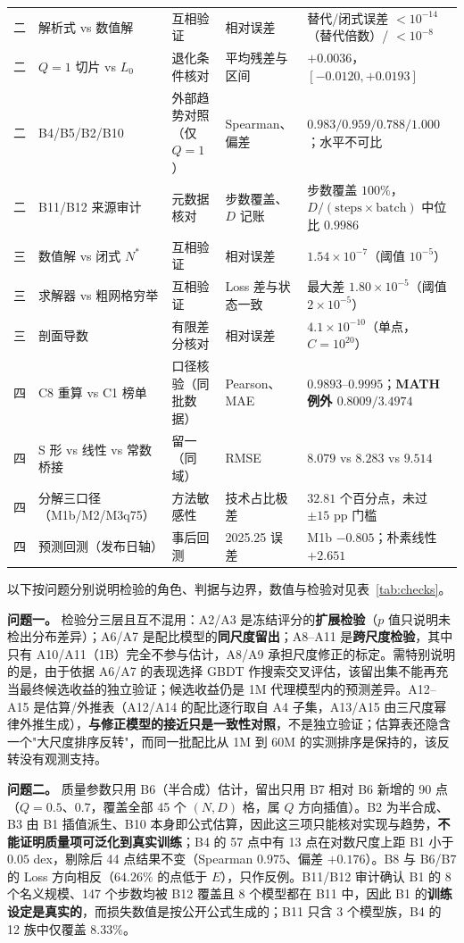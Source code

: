\begin{table}[H]
\begin{tabularx}{\textwidth}{@{}c p{3.85cm}p{1.55cm}p{2.25cm}X@{}}
二 & 解析式 vs 数值解 & 互相验证 & 相对误差 & 替代/闭式误差 $<10^{-14}$（替代倍数）/ $<10^{-8}$ \\
二 & $Q=1$ 切片 vs $L_0$ & 退化条件核对 & 平均残差与区间 & $+0.0036$，$[-0.0120,+0.0193]$ \\
二 & B4/B5/B2/B10 & 外部趋势对照（仅 $Q=1$） & Spearman、偏差 & $0.983/0.959/0.788/1.000$；水平不可比 \\
二 & B11/B12 来源审计 & 元数据核对 & 步数覆盖、$D$ 记账 & 步数覆盖 $100\%$，$D/(\text{steps}\times\text{batch})$ 中位比 $0.9986$ \\
三 & 数值解 vs 闭式 $N^*$ & 互相验证 & 相对误差 & $1.54\times10^{-7}$（阈值 $10^{-5}$）\\
三 & 求解器 vs 粗网格穷举 & 互相验证 & Loss 差与状态一致 & 最大差 $1.80\times10^{-5}$（阈值 $2\times10^{-5}$）\\
三 & 剖面导数 & 有限差分核对 & 相对误差 & $4.1\times10^{-10}$（单点，$C=10^{20}$） \\
四 & C8 重算 vs C1 榜单 & 口径核验（同批数据） & Pearson、MAE & $0.9893$–$0.9995$；\textbf{MATH 例外 $0.8009/3.4974$} \\
四 & S 形 vs 线性 vs 常数桥接 & 留一（同域） & RMSE & $8.079$ vs $8.283$ vs $9.514$ \\
四 & 分解三口径（M1b/M2/M3q75） & 方法敏感性 & 技术占比极差 & $32.81$ 个百分点，未过 $\pm15$ pp 门槛 \\
四 & 预测回测（发布日轴） & 事后回测 & 2025.25 误差 & M1b $-0.805$；朴素线性 $+2.651$ \\
\bottomrule
\end{tabularx}
\end{table}

以下按问题分别说明检验的角色、判据与边界，数值与检验对见表~\ref{tab:checks}。

\textbf{问题一。} 检验分三层且互不混用：A2/A3 是冻结评分的\textbf{扩展检验}（$p$ 值只说明未检出分布差异）；A6/A7 是配比模型的\textbf{同尺度留出}；A8–A11 是\textbf{跨尺度检验}，其中只有 A10/A11（1B）完全不参与估计，A8/A9 承担尺度修正的标定。需特别说明的是，由于依据 A6/A7 的表现选择 GBDT 作搜索交叉评估，该留出集不能再充当最终候选收益的独立验证；候选收益仍是 1M 代理模型内的预测差异。A12–A15 是估算/外推表（A12/A14 的配比逐行取自 A4 子集，A13/A15 由三尺度幂律外推生成），\textbf{与修正模型的接近只是一致性对照}，不是独立验证；估算表还隐含一个"大尺度排序反转"，而同一批配比从 1M 到 60M 的实测排序是保持的，该反转没有观测支持。

\textbf{问题二。} 质量参数只用 B6（半合成）估计，留出只用 B7 相对 B6 新增的 90 点（$Q=0.5$、$0.7$，覆盖全部 45 个 $(N,D)$ 格，属 $Q$ 方向插值）。B2 为半合成、B3 由 B1 插值派生、B10 本身即公式估算，因此这三项只能核对实现与趋势，\textbf{不能证明质量项可泛化到真实训练}；B4 的 57 点中有 13 点在对数尺度上距 B1 小于 $0.05$ dex，剔除后 44 点结果不变（Spearman $0.975$、偏差 $+0.176$）。B8 与 B6/B7 的 Loss 方向相反（$64.26\%$ 的点低于 $E$），只作反例。B11/B12 审计确认 B1 的 8 个名义规模、147 个步数均被 B12 覆盖且 8 个模型都在 B11 中，因此 B1 的\textbf{训练设定是真实的}，而损失数值是按公开公式生成的；B11 只含 3 个模型族，B4 的 12 族中仅覆盖 $8.33\%$。


